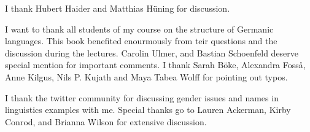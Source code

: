 \addchap{\lsAcknowledgementTitle} 

I thank Hubert Haider and Matthias Hüning for discussion.

I want to thank all students of my course on the structure of Germanic languages. This book
benefited enourmously from teir questions and the discussion during the lectures. 
Carolin Ulmer, %
and
Bastian Schoenfeld %
deserve special mention for important comments. I thank 
Sarah Böke,
Alexandra Fosså,
Anne Kilgus,
Nils P. Kujath
and 
Maya Tabea Wolff  
for pointing out typos.


I thank the twitter community for discussing gender issues and names in linguistics examples with
me. Special thanks go to Lauren Ackerman, Kirby Conrod, and Brianna Wilson for extensive discussion.




